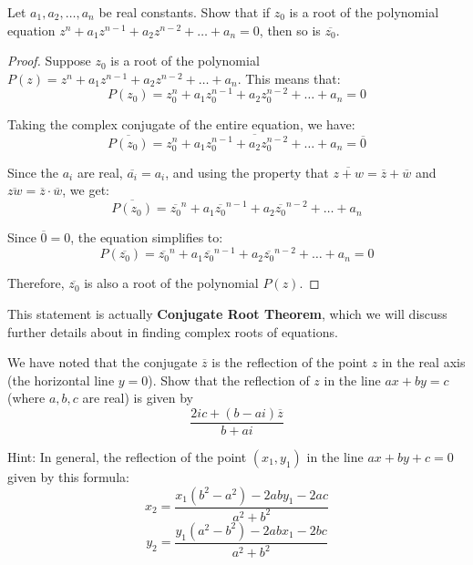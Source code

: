 \documentclass[
	12pt, %
	fleqn, %
	a4paper, %
]{LegrandOrangeBook}
\begin{document}
            \begin{exercise}\label{conjugate root}
                Let \( a_1, a_2, \ldots, a_n \) be real constants. Show that if \( z_0 \) is a root of the polynomial equation \( z^n + a_1z^{n-1} + a_2z^{n-2} + \ldots + a_n = 0 \), then so is \( \overline{z_0} \).
                \end{exercise}
                
                \begin{proof}
                Suppose \( z_0 \) is a root of the polynomial \( P(z) = z^n + a_1z^{n-1} + a_2z^{n-2} + \ldots + a_n \). This means that:
                \[ P(z_0) = z_0^n + a_1z_0^{n-1} + a_2z_0^{n-2} + \ldots + a_n = 0 \]
                
                Taking the complex conjugate of the entire equation, we have:
                \[ \overline{P(z_0)} = \overline{z_0^n + a_1z_0^{n-1} + a_2z_0^{n-2} + \ldots + a_n} = \overline{0} \]
                
                Since the \( a_i \) are real, \( \overline{a_i} = a_i \), and using the property that \( \overline{z + w} = \overline{z} + \overline{w} \) and \( \overline{zw} = \overline{z}\cdot \overline{w} \), we get:
                \[ \overline{P(z_0)} = \overline{z_0}^n + a_1\overline{z_0}^{n-1} + a_2\overline{z_0}^{n-2} + \ldots + a_n \]
                
                Since \( \overline{0} = 0 \), the equation simplifies to:
                \[ P(\overline{z_0}) = \overline{z_0}^n + a_1\overline{z_0}^{n-1} + a_2\overline{z_0}^{n-2} + \ldots + a_n = 0 \]
                
                Therefore, \( \overline{z_0} \) is also a root of the polynomial \( P(z) \).
                \end{proof}
                \begin{remark}
                    This statement is actually \textbf{Conjugate Root Theorem}, which we will discuss further details about in finding
                    complex roots of equations.
                \end{remark}
            \begin{exercise}
                We have noted that the conjugate \( \overline{z} \) is the reflection of the point \( z \) in the real axis (the horizontal line \( y = 0 \)). Show that the reflection of \( z \) in the line \( ax + by = c \) (where \( a, b, c \) are real) is given by
\[ \frac{2ic    + (b - ai)\overline{z}}{b + ai} \]
            \end{exercise}
            Hint: In general, the reflection of the point \( (x_1, y_1) \) in the line \( ax + by + c = 0 \) given by this formula:
            \[ 
            x_2 = \frac{x_1(b^2 - a^2) - 2aby_1 - 2ac}{a^2 + b^2}
            \]
            \[ 
            y_2 = \frac{y_1(a^2 - b^2) - 2abx_1 - 2bc}{a^2 + b^2}
            \]
            
\end{document}
